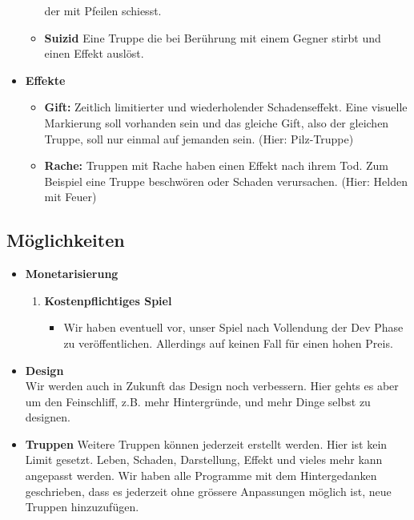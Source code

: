 \begin{itemize}
\begin{itemize}
            der mit Pfeilen schiesst.
        \item \textbf{Suizid}
            Eine Truppe die bei Berührung mit einem Gegner stirbt und einen Effekt auslöst.
    \end{itemize}
    \item \textbf{Effekte}
    \begin{itemize}
        \item \textbf{Gift:}
            Zeitlich limitierter und wiederholender Schadenseffekt. Eine visuelle Markierung soll vorhanden sein
            und das gleiche Gift, also der gleichen Truppe, soll nur einmal auf jemanden sein. (Hier: Pilz-Truppe)
        \item \textbf{Rache:}
            Truppen mit Rache haben einen Effekt nach ihrem Tod. Zum Beispiel eine Truppe beschwören oder Schaden verursachen. (Hier: Helden mit Feuer)
    \end{itemize}
\end{itemize}

\subsection{Möglichkeiten}
\begin{itemize}
    \item \textbf{Monetarisierung} \\
    \begin{enumerate}
        \item \textbf{Kostenpflichtiges Spiel}
        \begin{itemize}
            \item Wir haben eventuell vor, unser Spiel nach Vollendung der Dev Phase zu veröffentlichen. Allerdings auf keinen Fall für einen hohen Preis.
        \end{itemize}
    \end{enumerate}
    \item \textbf{Design} \\
        Wir werden auch in Zukunft das Design noch verbessern. Hier gehts es aber um den Feinschliff, z.B. mehr Hintergründe, und mehr Dinge selbst zu designen.
    \item \textbf{Truppen}
        Weitere Truppen können jederzeit erstellt werden. Hier ist kein Limit gesetzt. Leben, Schaden, Darstellung, Effekt und vieles mehr kann angepasst werden. 
        Wir haben alle Programme mit dem Hintergedanken geschrieben, dass es jederzeit ohne grössere Anpassungen möglich ist, neue Truppen hinzuzufügen.
    
\end{itemize}

